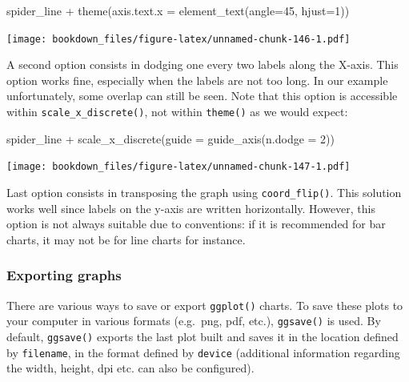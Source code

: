 \documentclass[
]{krantz}
\makeatletter
\newenvironment{Shaded}{\begin{snugshade}}{\end{snugshade}}
\newcommand{\AttributeTok}[1]{\textcolor[rgb]{0.61,0.61,0.61}{#1}}
\newcommand{\DecValTok}[1]{\textcolor[rgb]{0.06,0.06,0.06}{#1}}
\newcommand{\FunctionTok}[1]{\textcolor[rgb]{0,0,0}{#1}}
\newcommand{\NormalTok}[1]{#1}
\newcommand{\SpecialCharTok}[1]{\textcolor[rgb]{0,0,0}{#1}}
\newenvironment{kframe}{%
\medskip{}
\setlength{\fboxsep}{.8em}
 \def\at@end@of@kframe{}%
 \ifinner\ifhmode%
  \def\at@end@of@kframe{\end{minipage}}%
  \begin{minipage}{\columnwidth}%
 \fi\fi%
 \def\FrameCommand##1{\hskip\@totalleftmargin \hskip-\fboxsep
 \colorbox{shadecolor}{##1}\hskip-\fboxsep
     \hskip-\linewidth \hskip-\@totalleftmargin \hskip\columnwidth}%
 \MakeFramed {\advance\hsize-\width
   \@totalleftmargin\z@ \linewidth\hsize
   \@setminipage}}%
 {\par\unskip\endMakeFramed%
 \at@end@of@kframe}
\renewenvironment{Shaded}{\begin{kframe}}{\end{kframe}}
\makeatother
\begin{document}
\begin{Shaded}
\begin{Highlighting}[]
\NormalTok{spider\_line }\SpecialCharTok{+} 
  \FunctionTok{theme}\NormalTok{(}\AttributeTok{axis.text.x =} \FunctionTok{element\_text}\NormalTok{(}\AttributeTok{angle=}\DecValTok{45}\NormalTok{, }\AttributeTok{hjust=}\DecValTok{1}\NormalTok{))}
\end{Highlighting}
\end{Shaded}

\texttt{[image: bookdown\_files/figure-latex/unnamed-chunk-146-1.pdf]}

A second option consists in dodging one every two labels along the X-axis. This option works fine, especially when the labels are not too long. In our example unfortunately, some overlap can still be seen. Note that this option is accessible within \texttt{scale\_x\_discrete()}, not within \texttt{theme()} as we would expect:

\begin{Shaded}
\begin{Highlighting}[]
\NormalTok{spider\_line }\SpecialCharTok{+} 
  \FunctionTok{scale\_x\_discrete}\NormalTok{(}\AttributeTok{guide =} \FunctionTok{guide\_axis}\NormalTok{(}\AttributeTok{n.dodge =} \DecValTok{2}\NormalTok{))}
\end{Highlighting}
\end{Shaded}

\texttt{[image: bookdown\_files/figure-latex/unnamed-chunk-147-1.pdf]}

Last option consists in transposing the graph using \texttt{coord\_flip()}. This solution works well since labels on the y-axis are written horizontally. However, this option is not always suitable due to conventions: if it is recommended for bar charts, it may not be for line charts for instance.

\hypertarget{exporting-graphs}{%
\subsubsection{Exporting graphs}\label{exporting-graphs}}

There are various ways to save or export \texttt{ggplot()} charts. To save these plots to your computer in various formats (e.g.~png, pdf, etc.), \texttt{ggsave()} is used. By default, \texttt{ggsave()} exports the last plot built and saves it in the location defined by \texttt{filename}, in the format defined by \texttt{device} (additional information regarding the width, height, dpi etc. can also be configured).
\end{document}
